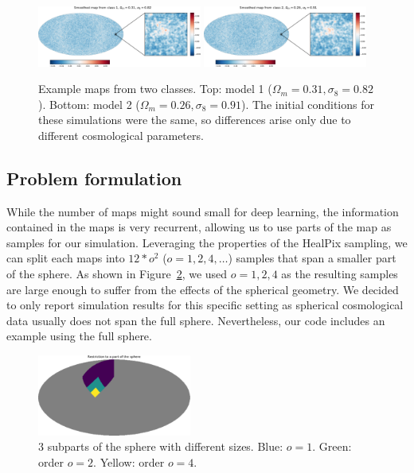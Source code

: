\documentclass[final,twocolumn,3p,times,authoryear]{elsarticle}
\newcommand{\nati}[1]{{\color[rgb]{.1,.6,.1}{#1}}}
\newcommand{\figref}[1]{Figure~\ref{fig:#1}}
\newcommand{\1}{\b{1}}              %
\newcommand{\0}{\b{0}}              %
\begin{document}
\begin{figure}[!ht]
\centering
\includegraphics[width=0.48\textwidth]{figures/smooth_map_class_1.pdf}
\includegraphics[width=0.48\textwidth]{figures/smooth_map_class_2.pdf}
\caption{Example maps from two classes. Top: model 1 ($\Omega_m=0.31, \sigma_8=0.82$). Bottom: model 2 ($\Omega_m=0.26, \sigma_8=0.91$).
The initial conditions for these simulations were the same, so differences arise only due to different cosmological parameters. \nati{Tomek: Is this correct?}}
\label{fig:map_sample}
\end{figure}



\subsection{Problem formulation}
While the number of maps might sound small for deep learning, the information contained in the maps is very recurrent, allowing us to use parts of the map as samples for our simulation.
Leveraging the properties of the HealPix sampling, we can split each maps
into $12*o^2$ ($o=1,2,4,\dots$) samples that span a smaller part of the sphere.
As shown in \figref{subpart_sphere}, we used $o=1,2,4$ as the resulting
samples are large enough to suffer from the effects of the spherical geometry. We
decided to only report simulation results for this specific setting as spherical
cosmological data usually does not span the full sphere. Nevertheless, our code
includes an example using the full sphere.

\begin{figure}[!ht]
\centering
\includegraphics[width=0.45\textwidth]{figures/part_sphere.pdf}
\caption{3 subparts of the sphere with different sizes. Blue: $o=1$. Green: order $o=2$. Yellow: order $o=4$.}
\label{fig:subpart_sphere}
\end{figure}
\end{document}
